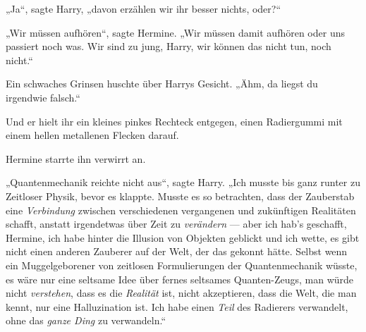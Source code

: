„Ja“, sagte Harry, „davon erzählen wir ihr besser nichts, oder?“

„Wir müssen aufhören“, sagte Hermine.
„Wir müssen damit aufhören oder uns passiert noch was. Wir sind zu jung, Harry, wir können das nicht tun, noch nicht.“

Ein schwaches Grinsen huschte über Harrys Gesicht. „Ähm, da liegst du irgendwie falsch.“

Und er hielt ihr ein kleines pinkes Rechteck entgegen, einen Radiergummi mit einem hellen metallenen Flecken darauf.

Hermine starrte ihn verwirrt an.

„Quantenmechanik reichte nicht aus“, sagte Harry.
„Ich musste bis ganz runter zu Zeitloser Physik, bevor es klappte. Musste es so betrachten, dass der Zauberstab eine \emph{Verbindung} zwischen verschiedenen vergangenen und zukünftigen Realitäten schafft, anstatt irgendetwas über Zeit zu \emph{verändern} — aber ich hab’s geschafft, Hermine, ich habe hinter die Illusion von Objekten geblickt und ich wette, es gibt nicht einen anderen Zauberer auf der Welt, der das gekonnt hätte. Selbst wenn ein Muggelgeborener von zeitlosen Formulierungen der Quantenmechanik wüsste, es wäre nur eine seltsame Idee über fernes seltsames Quanten-Zeugs, man würde nicht \emph{verstehen}, dass es die \emph{Realität} ist, nicht akzeptieren, dass die Welt, die man kennt, nur eine Halluzination ist. Ich habe einen \emph{Teil} des Radierers verwandelt, ohne das \emph{ganze Ding} zu verwandeln.“

